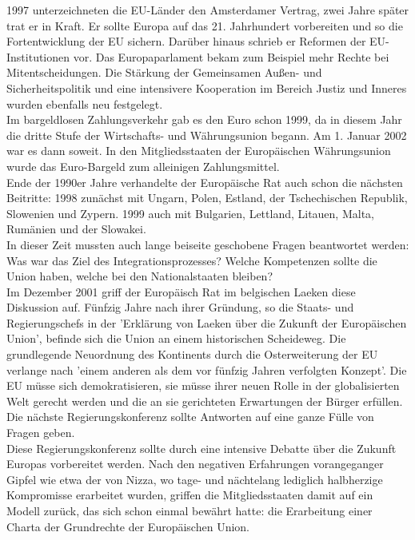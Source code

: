 \documentclass[letterpaper, 12pt]{article}
\begin{document}
1997 unterzeichneten die EU-Länder den Amsterdamer Vertrag, zwei Jahre später trat er in Kraft. Er sollte Europa auf das 21. Jahrhundert vorbereiten und so die Fortentwicklung der EU sichern. Darüber hinaus schrieb er Reformen der EU-Institutionen vor. Das Europaparlament bekam zum Beispiel mehr Rechte bei Mitentscheidungen. Die Stärkung der Gemeinsamen Außen- und Sicherheitspolitik und eine intensivere Kooperation im Bereich Justiz und Inneres wurden ebenfalls neu festgelegt. \\
Im bargeldlosen Zahlungsverkehr gab es den Euro schon 1999, da in diesem Jahr die dritte Stufe der Wirtschafts- und Währungsunion begann. Am 1. Januar 2002 war es dann soweit. In den Mitgliedsstaaten der Europäischen Währungsunion wurde das Euro-Bargeld zum alleinigen Zahlungsmittel. \\
Ende der 1990er Jahre verhandelte der Europäische Rat auch schon die nächsten Beitritte: 1998 zunächst mit Ungarn, Polen, Estland, der Tschechischen Republik, Slowenien und Zypern. 1999 auch mit Bulgarien, Lettland, Litauen, Malta, Rumänien und der Slowakei. \\
In dieser Zeit mussten auch lange beiseite geschobene Fragen beantwortet werden: Was war das Ziel des Integrationsprozesses? Welche Kompetenzen sollte die Union haben, welche bei den Nationalstaaten bleiben? \\
Im Dezember 2001 griff der Europäisch Rat im belgischen Laeken diese Diskussion auf. Fünfzig Jahre nach ihrer Gründung, so die Staats- und Regierungschefs in der 'Erklärung von Laeken über die Zukunft der Europäischen Union', befinde sich die Union an einem historischen Scheideweg. Die grundlegende Neuordnung des Kontinents durch die Osterweiterung der EU verlange nach 'einem anderen als dem vor fünfzig Jahren verfolgten Konzept'. Die EU müsse sich demokratisieren, sie müsse ihrer neuen Rolle in der globalisierten Welt gerecht werden und die an sie gerichteten Erwartungen der Bürger erfüllen. Die nächste Regierungskonferenz sollte Antworten auf eine ganze Fülle von Fragen geben. \\
Diese Regierungskonferenz sollte durch eine intensive Debatte über die Zukunft Europas vorbereitet werden. Nach den negativen Erfahrungen vorangeganger  Gipfel wie etwa der von Nizza, wo tage- und nächtelang lediglich halbherzige Kompromisse erarbeitet wurden, griffen die Mitgliedsstaaten damit auf ein Modell zurück, das sich schon einmal bewährt hatte: die Erarbeitung einer Charta der Grundrechte der Europäischen Union. \\
\end{document}
